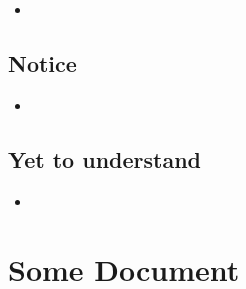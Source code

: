 \documentclass{article}
\begin{document}
    \begin{itemize}

    \item 
    
    \end{itemize}

\subsection{Notice}

    \begin{itemize}

    \item 
    
    \end{itemize}

\subsection{Yet to understand}

    \begin{itemize}

    \item 
    
    \end{itemize}

\section{Some Document}
\end{document}
